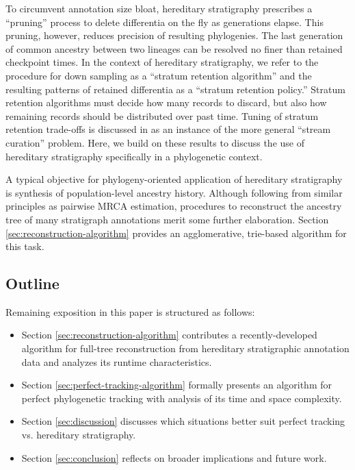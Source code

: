 To circumvent annotation size bloat, hereditary stratigraphy prescribes a ``pruning'' process to delete differentia on the fly as generations elapse.
This pruning, however, reduces precision of resulting phylogenies.
The last generation of common ancestry between two lineages can be resolved no finer than retained checkpoint times.
In the context of hereditary stratigraphy, we refer to the procedure for down sampling as a ``stratum retention algorithm'' and the resulting patterns of retained differentia as a ``stratum retention policy.''
Stratum retention algorithms must decide how many records to discard, but also how remaining records should be distributed over past time.
Tuning of stratum retention trade-offs is discussed in \citet{moreno2024algorithms} as an instance of the more general ``stream curation'' problem.
Here, we build on these results to discuss the use of hereditary stratigraphy specifically in a phylogenetic context.

A typical objective for phylogeny-oriented application of hereditary stratigraphy is synthesis of population-level ancestry history.
Although following from similar principles as pairwise MRCA estimation, procedures to reconstruct the ancestry tree of many stratigraph annotations merit some further elaboration.
Section \ref{sec:reconstruction-algorithm} provides an agglomerative, trie-based algorithm for this task.

\subsection{Outline}

Remaining exposition in this paper is structured as follows:
\begin{itemize}
\item Section \ref{sec:reconstruction-algorithm} contributes a recently-developed algorithm for full-tree reconstruction from hereditary stratigraphic annotation data and analyzes its runtime characteristics.
\item Section \ref{sec:perfect-tracking-algorithm} formally presents an algorithm for perfect phylogenetic tracking with analysis of its time and space complexity.
\item Section \ref{sec:discussion} discusses which situations better suit perfect tracking vs. hereditary stratigraphy.
\item Section \ref{sec:conclusion} reflects on broader implications and future work.
\end{itemize}
